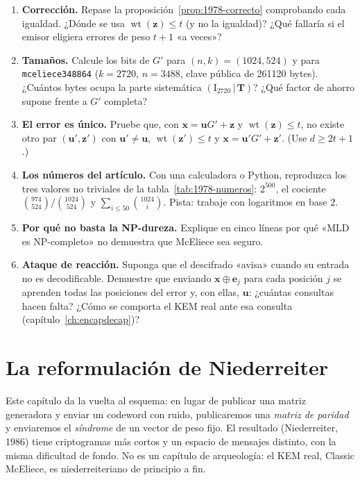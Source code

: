 \documentclass[11pt,a4paper,oneside]{report}
\newcommand{\wt}{\operatorname{wt}}
\newcommand{\Tmat}{\mathbf{T}}          %
\newcommand{\ve}{\mathbf{e}}
\newcommand{\vx}{\mathbf{x}}
\newcommand{\vu}{\mathbf{u}}
\newcommand{\vz}{\mathbf{z}}
\begin{document}
\begin{enumerate}[leftmargin=1.6em,itemsep=4pt]
  \item \textbf{Corrección.} Repase la
        proposición~\ref{prop:1978-correcto} comprobando cada igualdad.
        ¿Dónde se usa $\wt(\vz)\le t$ (y no la igualdad)? ¿Qué fallaría
        si el emisor eligiera errores de peso $t+1$ «a veces»?
  \item \textbf{Tamaños.} Calcule los bits de $G'$ para
        $(n,k)=(1024,524)$ y para \texttt{mceliece348864}
        ($k=2720$, $n=3488$, clave pública de \num{261120} bytes).
        ¿Cuántos bytes ocupa la parte sistemática
        $(\mathrm{I}_{2720}\,|\,\Tmat)$? ¿Qué factor de ahorro supone
        frente a $G'$ completa?
  \item \textbf{El error es único.} Pruebe que, con
        $\vx=\vu G'+\vz$ y $\wt(\vz)\le t$, no existe otro par
        $(\vu',\vz')$ con $\vu'\ne\vu$, $\wt(\vz')\le t$ y
        $\vx=\vu'G'+\vz'$. (Use $d\ge2t+1$.)
  \item \textbf{Los números del artículo.} Con una calculadora o
        Python, reproduzca los tres valores no triviales de la
        tabla~\ref{tab:1978-numeros}: $2^{500}$, el cociente
        $\binom{974}{524}/\binom{1024}{524}$ y
        $\sum_{i\le50}\binom{1024}{i}$. Pista: trabaje con logaritmos
        en base $2$.
  \item \textbf{Por qué no basta la NP-dureza.} Explique en cinco
        líneas por qué «MLD es NP-completo» no demuestra que McEliece
        sea seguro.
  \item \textbf{Ataque de reacción.} Suponga que el descifrado «avisa»
        cuando su entrada no es decodificable. Demuestre que enviando
        $\vx\oplus\ve_j$ para cada posición $j$ se aprenden todas las
        posiciones del error y, con ellas, $\vu$: ¿cuántas consultas
        hacen falta? ¿Cómo se comporta el KEM real ante esa consulta
        (capítulo~\ref{ch:encapdecap})?
\end{enumerate}

\chapter{La reformulación de Niederreiter}\label{ch:niederreiter}

\begin{roadmap}
Este capítulo da la vuelta al esquema: en lugar de publicar una matriz
generadora y enviar un codeword con ruido, publicaremos una
\emph{matriz de paridad} y enviaremos el \emph{síndrome} de un vector de
peso fijo. El resultado (Niederreiter, 1986) tiene criptogramas más
cortos y un espacio de mensajes distinto, con la misma dificultad de
fondo. No es un capítulo de arqueología: el KEM real,
Classic McEliece, es niederreiteriano de principio a fin.
\end{roadmap}
\end{document}
